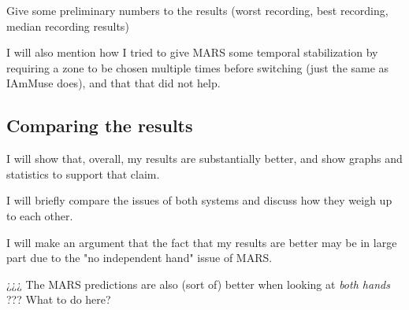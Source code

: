 Give some preliminary numbers to the results (worst recording, best recording, median recording results)

I will also mention how I tried to give MARS some temporal stabilization by requiring a zone to be chosen multiple times before switching (just the same as IAmMuse does), and that that did not help.


\subsection{Comparing the results}
\label{sub-section: experiments - results - comparing the results}

I will show that, overall, my results are substantially better, and show graphs and statistics to support that claim.

I will briefly compare the issues of both systems and discuss how they weigh up to each other.

I will make an argument that the fact that my results are better may be in large part due to the "no independent hand" issue of MARS.

¿¿¿ The MARS predictions are also (sort of) better when looking at \textit{both hands} ??? What to do here?
